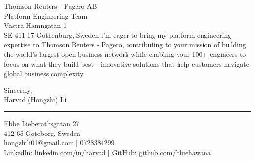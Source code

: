 \documentclass[a4paper,10pt]{article}
\begin{document}
\begin{letter}{\color{darkblue}
Thomson Reuters - Pagero AB\\
Platform Engineering Team\\
Västra Hamngatan 1\\
SE-411 17 Gothenburg, Sweden}
I'm eager to bring my platform engineering expertise to Thomson Reuters - Pagero, contributing to your mission of building the world's largest open business network while enabling your 100+ engineers to focus on what they build best—innovative solutions that help customers navigate global business complexity.

\vspace{10pt}

\closing{
Sincerely,\\
\vspace{15pt}
Harvad (Hongzhi) Li
}

\vspace{20pt}

{\color{darkblue}\rule{\linewidth}{0.6pt}}
\vspace{4pt}

{\color{darkblue}
Ebbe Lieberathsgatan 27\\
412 65 Göteborg, Sweden\\
hongzhili01@gmail.com | 0728384299\\
LinkedIn: \href{https://www.linkedin.com/in/harvad/}{linkedin.com/in/harvad} | GitHub: \href{https://github.com/bluehawana}{github.com/bluehawana}
}

\end{letter}
\end{document}
